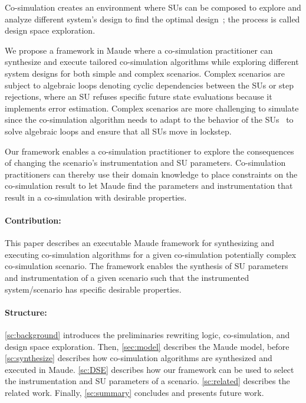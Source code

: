 Co-simulation creates an environment where SUs can be composed to explore and analyze different system's design to find the optimal design~\cite{dse,gamble_design_2014}; the process is called design space exploration.

We propose a framework in Maude where a co-simulation practitioner can synthesize and execute tailored co-simulation algorithms while exploring different system designs for both simple and complex scenarios.
Complex scenarios are subject to algebraic loops denoting cyclic dependencies between the SUs or step rejections, where an SU refuses specific future state evaluations because it implements error estimation.
Complex scenarios are more challenging to simulate since the co-simulation algorithm needs to adapt to the behavior of the SUs~\cite{thrane2021} to solve algebraic loops and ensure that all SUs move in lockstep.

Our framework enables a co-simulation practitioner to explore the consequences of changing the scenario's instrumentation and SU parameters. 
Co-simulation practitioners can thereby use their domain knowledge to place constraints on the co-simulation result to let Maude find the parameters and instrumentation that result in a co-simulation with desirable properties. 

\paragraph{Contribution:}
This paper describes an executable Maude framework for synthesizing and executing co-simulation algorithms for a given co-simulation potentially complex co-simulation scenario.
The framework enables the synthesis of SU parameters and instrumentation of a given scenario such that the instrumented system/scenario has specific desirable properties.

\paragraph{Structure:}
\cref{sc:background} introduces the preliminaries rewriting logic, co-simulation, and design space exploration.
Then, \cref{sec:model} describes the Maude model, before \cref{sc:synthesize} describes how co-simulation algorithms are synthesized and executed in Maude.
\cref{sc:DSE} describes how our framework can be used to select the instrumentation and SU parameters of a scenario.
\cref{sc:related} describes the related work. 
Finally, \cref{sc:summary} concludes and presents future work.